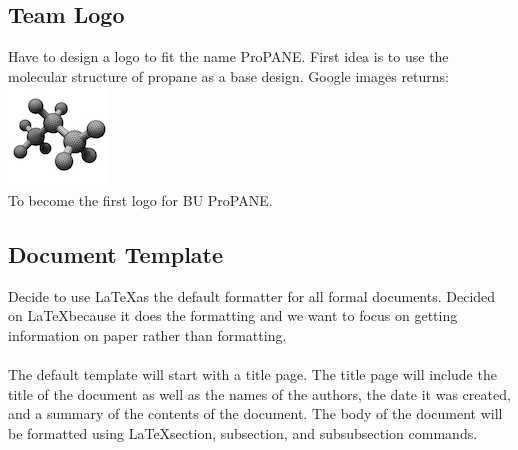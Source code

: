 \documentclass[]{article}
\begin{document}
		\subsection{Team Logo}
			Have to design a logo to fit the name ProPANE. First idea is to use the molecular structure of propane as a base design. Google images returns: \\
			\includegraphics{images/logo.jpeg}\\
			To become the first logo for BU ProPANE.
			
		\subsection{Document Template}
			Decide to use \LaTeX as the default formatter for all formal documents. Decided on \LaTeX because it does the formatting and we want to focus on getting information on paper rather than formatting. \\
			\\
			The default template will start with a title page. The title page will include the title of the document as well as the names of the authors, the date it was created, and a summary of the contents of the document. The body of the document will be formatted using \LaTeX section, subsection, and subsubsection commands. 
			
\end{document}
